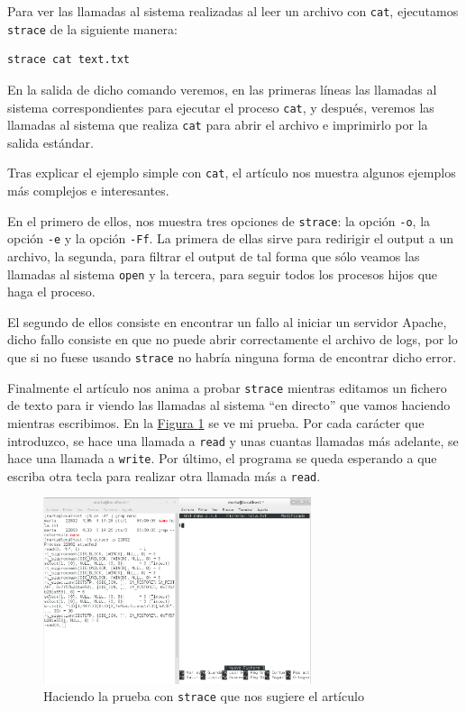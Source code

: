 \documentclass[10pt,a4paper,spanish]{article}
\numberwithin{equation}{section} %
\numberwithin{figure}{section} %
\numberwithin{table}{section} %
\begin{document}
Para ver las llamadas al sistema realizadas al leer un archivo con \texttt{cat}, ejecutamos \texttt{strace} de la siguiente manera:
\begin{verbatim}
strace cat text.txt
\end{verbatim}

En la salida de dicho comando veremos, en las primeras líneas las llamadas al sistema correspondientes para ejecutar el proceso \texttt{cat}, y después, veremos las llamadas al sistema que realiza \texttt{cat} para abrir el archivo e imprimirlo por la salida estándar.

Tras explicar el ejemplo simple con \texttt{cat}, el artículo nos muestra algunos ejemplos más complejos e interesantes.

En el primero de ellos, nos muestra tres opciones de \texttt{strace}: la opción \texttt{-o}, la opción \texttt{-e} y la opción \texttt{-Ff}. La primera de ellas sirve para redirigir el output a un archivo, la segunda, para filtrar el output de tal forma que sólo veamos las llamadas al sistema \texttt{open} y la tercera, para seguir todos los procesos hijos que haga el proceso.

El segundo de ellos consiste en encontrar un fallo al iniciar un servidor Apache, dicho fallo consiste en que no puede abrir correctamente el archivo de logs, por lo que si no fuese usando \texttt{strace} no habría ninguna forma de encontrar dicho error.

Finalmente el artículo nos anima a probar \texttt{strace} mientras editamos un fichero de texto para ir viendo las llamadas al sistema ``en directo'' que vamos haciendo mientras escribimos. En la \hyperref[straceprueba]{Figura \ref*{straceprueba}} se ve mi prueba. Por cada carácter que introduzco, se hace una llamada a \texttt{read} y unas cuantas llamadas más adelante, se hace una llamada a \texttt{write}. Por último, el programa se queda esperando a que escriba otra tecla para realizar otra llamada más a \texttt{read}.

\begin{figure}[!h]
    \centering
    \includegraphics[width=0.7\textwidth]{39}
    \caption{Haciendo la prueba con \texttt{strace} que nos sugiere el artículo}
    \label{straceprueba}
\end{figure}
\end{document}
